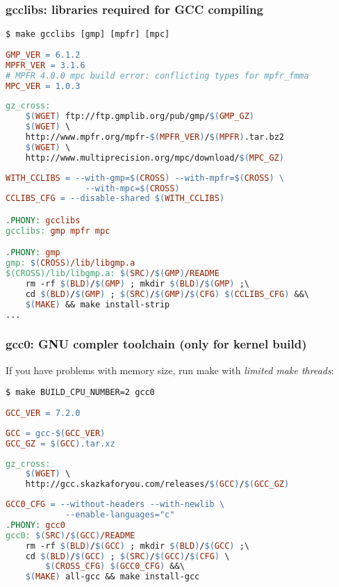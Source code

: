 \subsubsection{gcclibs: libraries required for GCC compiling}

\begin{lstlisting}
$ make gcclibs [gmp] [mpfr] [mpc]
\end{lstlisting}
\begin{lstlisting}[language=make,title=mk/version]
GMP_VER = 6.1.2
MPFR_VER = 3.1.6
# MPFR 4.0.0 mpc build error: conflicting types for mpfr_fmma  
MPC_VER = 1.0.3
\end{lstlisting}
\begin{lstlisting}[language=make,title=mk/gz]
gz_cross:
	$(WGET) ftp://ftp.gmplib.org/pub/gmp/$(GMP_GZ)
	$(WGET) \
	http://www.mpfr.org/mpfr-$(MPFR_VER)/$(MPFR).tar.bz2
	$(WGET) \
	http://www.multiprecision.org/mpc/download/$(MPC_GZ)
\end{lstlisting}
\begin{lstlisting}[language=make,title=mk/cross]
WITH_CCLIBS = --with-gmp=$(CROSS) --with-mpfr=$(CROSS) \
				--with-mpc=$(CROSS)  
CCLIBS_CFG = --disable-shared $(WITH_CCLIBS)

.PHONY: gcclibs
gcclibs: gmp mpfr mpc

.PHONY: gmp
gmp: $(CROSS)/lib/libgmp.a
$(CROSS)/lib/libgmp.a: $(SRC)/$(GMP)/README
	rm -rf $(BLD)/$(GMP) ; mkdir $(BLD)/$(GMP) ;\
	cd $(BLD)/$(GMP) ; $(SRC)/$(GMP)/$(CFG) $(CCLIBS_CFG) &&\
	$(MAKE) && make install-strip
...	
\end{lstlisting}

\clearpage
\subsubsection{gcc0: GNU compler toolchain (only for kernel build)}

If you have problems with memory size, run make with \emph{limited make
threads}:
\begin{lstlisting}
$ make BUILD_CPU_NUMBER=2 gcc0
\end{lstlisting}
\begin{lstlisting}[language=make,title=mk/version]
GCC_VER = 7.2.0
\end{lstlisting}
\begin{lstlisting}[language=make,title=mk/package]
GCC = gcc-$(GCC_VER)
GCC_GZ = $(GCC).tar.xz
\end{lstlisting}
\begin{lstlisting}[language=make,title=mk/gz]
gz_cross:
	$(WGET) \
	http://gcc.skazkaforyou.com/releases/$(GCC)/$(GCC_GZ)
\end{lstlisting}
\begin{lstlisting}[language=make,title=mk/cross]
GCC0_CFG = --without-headers --with-newlib \
			--enable-languages="c"
.PHONY: gcc0
gcc0: $(SRC)/$(GCC)/README
	rm -rf $(BLD)/$(GCC) ; mkdir $(BLD)/$(GCC) ;\
	cd $(BLD)/$(GCC) ; $(SRC)/$(GCC)/$(CFG) \
		$(CROSS_CFG) $(GCC0_CFG) &&\
	$(MAKE) all-gcc && make install-gcc
\end{lstlisting}

